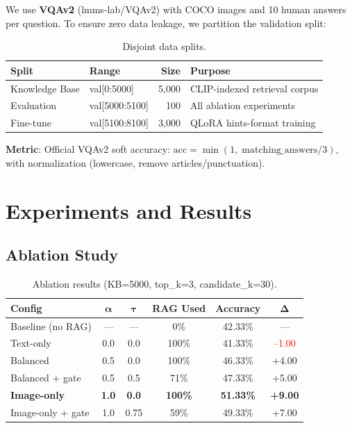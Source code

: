 \documentclass[12pt, a4paper]{article}
\begin{document}
We use \textbf{VQAv2} (lmms-lab/VQAv2) with COCO images and 10 human answers per question. To ensure zero data leakage, we partition the validation split:

\begin{table}[H]
\centering
\caption{Disjoint data splits.}
\renewcommand{\arraystretch}{1.3}
\begin{tabular}{@{} l l r l @{}}
\toprule
\textbf{Split} & \textbf{Range} & \textbf{Size} & \textbf{Purpose} \\
\midrule
Knowledge Base & val[0:5000] & 5,000 & CLIP-indexed retrieval corpus \\
Evaluation & val[5000:5100] & 100 & All ablation experiments \\
Fine-tune & val[5100:8100] & 3,000 & QLoRA hints-format training \\
\bottomrule
\end{tabular}
\end{table}

\textbf{Metric}: Official VQAv2 soft accuracy: $\text{acc} = \min(1,\; \text{matching\_answers} / 3)$, with normalization (lowercase, remove articles/punctuation).

\section{Experiments and Results}

\subsection{Ablation Study}

\begin{table}[H]
\centering
\caption{Ablation results (KB=5000, top\_k=3, candidate\_k=30).}
\renewcommand{\arraystretch}{1.3}
\begin{tabular}{@{} l c c c c c @{}}
\toprule
\textbf{Config} & $\boldsymbol{\alpha}$ & $\boldsymbol{\tau}$ & \textbf{RAG Used} & \textbf{Accuracy} & $\boldsymbol{\Delta}$ \\
\midrule
Baseline (no RAG) & --- & --- & 0\% & 42.33\% & --- \\
Text-only & 0.0 & 0.0 & 100\% & 41.33\% & \textcolor{red}{--1.00} \\
Balanced & 0.5 & 0.0 & 100\% & 46.33\% & \textcolor{green!60!black}{+4.00} \\
Balanced + gate & 0.5 & 0.5 & 71\% & 47.33\% & \textcolor{green!60!black}{+5.00} \\
\textbf{Image-only} & \textbf{1.0} & \textbf{0.0} & \textbf{100\%} & \textbf{51.33\%} & \textcolor{green!60!black}{\textbf{+9.00}} \\
Image-only + gate & 1.0 & 0.75 & 59\% & 49.33\% & \textcolor{green!60!black}{+7.00} \\
\bottomrule
\end{tabular}
\end{table}
\end{document}
